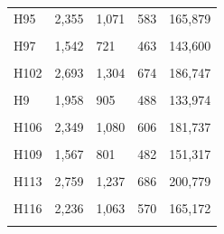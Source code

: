 \documentclass[
  a4paper,
  titlepage]{article}
\begin{document}
\begin{longtable}[t]{lllll}
H95 & 2,355 & 1,071 & 583 & 165,879\\
 
\cellcolor{gray!6}{H96} & \cellcolor{gray!6}{2,852} & \cellcolor{gray!6}{1,326} & \cellcolor{gray!6}{646} & \cellcolor{gray!6}{179,977}\\
 
H97 & 1,542 & 721 & 463 & 143,600\\
 
\cellcolor{gray!6}{H100} & \cellcolor{gray!6}{3,041} & \cellcolor{gray!6}{1,378} & \cellcolor{gray!6}{700} & \cellcolor{gray!6}{200,293}\\
 
H102 & 2,693 & 1,304 & 674 & 186,747\\
 
\cellcolor{gray!6}{H104} & \cellcolor{gray!6}{3,389} & \cellcolor{gray!6}{1,480} & \cellcolor{gray!6}{750} & \cellcolor{gray!6}{214,179}\\
 
H9 & 1,958 & 905 & 488 & 133,974\\
 
\cellcolor{gray!6}{H105} & \cellcolor{gray!6}{1,679} & \cellcolor{gray!6}{803} & \cellcolor{gray!6}{487} & \cellcolor{gray!6}{125,988}\\
 
H106 & 2,349 & 1,080 & 606 & 181,737\\
 
\cellcolor{gray!6}{H108} & \cellcolor{gray!6}{1,938} & \cellcolor{gray!6}{864} & \cellcolor{gray!6}{484} & \cellcolor{gray!6}{146,143}\\
 
H109 & 1,567 & 801 & 482 & 151,317\\
 
\cellcolor{gray!6}{H112} & \cellcolor{gray!6}{2,733} & \cellcolor{gray!6}{1,266} & \cellcolor{gray!6}{748} & \cellcolor{gray!6}{198,759}\\
 
H113 & 2,759 & 1,237 & 686 & 200,779\\
 
\cellcolor{gray!6}{H115} & \cellcolor{gray!6}{3,809} & \cellcolor{gray!6}{1,722} & \cellcolor{gray!6}{843} & \cellcolor{gray!6}{244,684}\\
 
H116 & 2,236 & 1,063 & 570 & 165,172\\
 
\cellcolor{gray!6}{H117} & \cellcolor{gray!6}{3,294} & \cellcolor{gray!6}{1,470} & \cellcolor{gray!6}{748} & \cellcolor{gray!6}{200,140}\\
 

\end{longtable}
\end{document}
